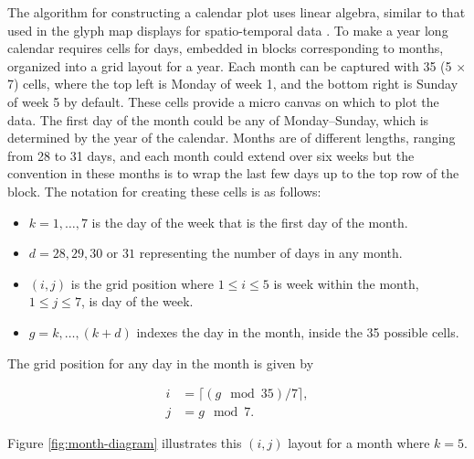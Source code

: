 \documentclass[article]{jss}
\providecommand{\tightlist}{%
  \setlength{\itemsep}{0pt}\setlength{\parskip}{0pt}}
\theoremstyle{definition}
\theoremstyle{definition}
\theoremstyle{remark}
\begin{document}
The algorithm for constructing a calendar plot uses linear algebra,
similar to that used in the glyph map displays for spatio-temporal data
\citep{Wickham2012glyph}. To make a year long calendar requires cells
for days, embedded in blocks corresponding to months, organized into a
grid layout for a year. Each month can be captured with 35 (5 \(\times\)
7) cells, where the top left is Monday of week 1, and the bottom right
is Sunday of week 5 by default. These cells provide a micro canvas on
which to plot the data. The first day of the month could be any of
Monday--Sunday, which is determined by the year of the calendar. Months
are of different lengths, ranging from 28 to 31 days, and each month
could extend over six weeks but the convention in these months is to
wrap the last few days up to the top row of the block. The notation for
creating these cells is as follows:

\begin{itemize}
\tightlist
\item
  \(k = 1, \dots , 7\) is the day of the week that is the first day of
  the month.
\item
  \(d = 28, 29, 30\) or \(31\) representing the number of days in any
  month.
\item
  \((i, j)\) is the grid position where \(1 \le i \le 5\) is week within
  the month, \(1 \le j \le 7\), is day of the week.
\item
  \(g = k, \dots,(k+d)\) indexes the day in the month, inside the 35
  possible cells.
\end{itemize}

The grid position for any day in the month is given by

\begin{equation}
  \begin{aligned}
  i &= \lceil (g \mod 35) / 7\rceil, \\
  j &= g \mod 7. \label{eq:grid}
  \end{aligned}
\end{equation}

Figure \ref{fig:month-diagram} illustrates this \((i,j)\) layout for a
month where \(k=5\).
\end{document}

